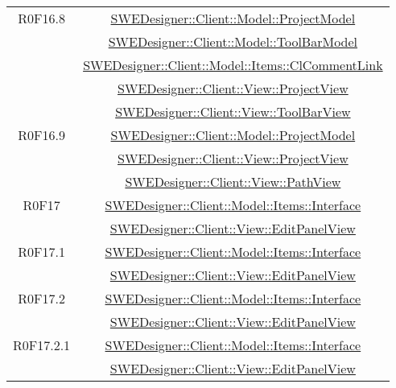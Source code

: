 \documentclass[../DefinizioneDiProdotto.tex]{subfiles}
\begin{document}
\begin{longtable}{|c|c|}
				R0F16.8
				& \hyperlink{SWEDesigner::Client::Model::ProjectModel}{SWEDesigner::Client::Model::ProjectModel}\\
				& \hyperlink{SWEDesigner::Client::Model::ToolBarModel}{SWEDesigner::Client::Model::ToolBarModel}\\
				& \hyperlink{SWEDesigner::Client::Model::Items::ClCommentLink}{SWEDesigner::Client::Model::Items::ClCommentLink}\\
				& \hyperlink{SWEDesigner::Client::View::ProjectView}{SWEDesigner::Client::View::ProjectView}\\
				& \hyperlink{SWEDesigner::Client::View::ToolBarView}{SWEDesigner::Client::View::ToolBarView}\\
				\hline

				R0F16.9
				& \hyperlink{SWEDesigner::Client::Model::ProjectModel}{SWEDesigner::Client::Model::ProjectModel}\\
				& \hyperlink{SWEDesigner::Client::View::ProjectView}{SWEDesigner::Client::View::ProjectView}\\
				& \hyperlink{SWEDesigner::Client::View::PathView}{SWEDesigner::Client::View::PathView}\\
				\hline

				R0F17
				& \hyperlink{SWEDesigner::Client::Model::Items::Interface}{SWEDesigner::Client::Model::Items::Interface}\\
				& \hyperlink{SWEDesigner::Client::View::EditPanelView}{SWEDesigner::Client::View::EditPanelView}\\
				\hline

				R0F17.1
				& \hyperlink{SWEDesigner::Client::Model::Items::Interface}{SWEDesigner::Client::Model::Items::Interface}\\
				& \hyperlink{SWEDesigner::Client::View::EditPanelView}{SWEDesigner::Client::View::EditPanelView}\\
				\hline

				R0F17.2
				& \hyperlink{SWEDesigner::Client::Model::Items::Interface}{SWEDesigner::Client::Model::Items::Interface}\\
				& \hyperlink{SWEDesigner::Client::View::EditPanelView}{SWEDesigner::Client::View::EditPanelView}\\
				\hline

				R0F17.2.1
				& \hyperlink{SWEDesigner::Client::Model::Items::Interface}{SWEDesigner::Client::Model::Items::Interface}\\
				& \hyperlink{SWEDesigner::Client::View::EditPanelView}{SWEDesigner::Client::View::EditPanelView}\\
				\hline


\end{longtable}
\end{document}
